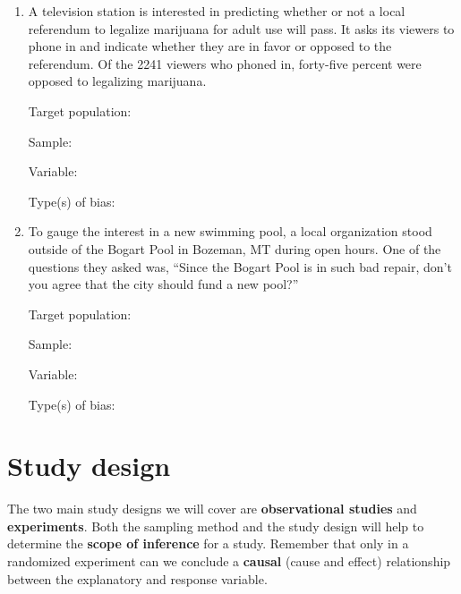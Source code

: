 \documentclass[
]{report}
\begin{document}
\begin{enumerate}
\def\labelenumi{\arabic{enumi}.}
\setcounter{enumi}{2}
\item
  A television station is interested in predicting whether or not a local referendum to legalize marijuana for adult use will pass. It asks its viewers to phone in and indicate whether they are in favor or opposed to the referendum. Of the 2241 viewers who phoned in, forty-five percent were opposed to legalizing marijuana.
  \vspace{0.1in}

  Target population:
  \vspace{0.3in}

  Sample:
  \vspace{0.3in}

  Variable:
  \vspace{0.3in}

  Type(s) of bias:
  \vspace{0.3in}
\item
  To gauge the interest in a new swimming pool, a local organization stood outside of the Bogart Pool in Bozeman, MT during open hours. One of the questions they asked was, ``Since the Bogart Pool is in such bad repair, don't you agree that the city should fund a new pool?''
  \vspace{0.1in}

  Target population:
  \vspace{0.3in}

  Sample:
  \vspace{0.3in}

  Variable:
  \vspace{0.3in}

  Type(s) of bias:
  \vspace{0.3in}
\end{enumerate}

\newpage

\hypertarget{study-design}{%
\section{Study design}\label{study-design}}

The two main study designs we will cover are \textbf{observational studies} and \textbf{experiments}. Both the sampling method and the study design will help to determine the \textbf{scope of inference} for a study. Remember that only in a randomized experiment can we conclude a \textbf{causal} (cause and effect) relationship between the explanatory and response variable.
\end{document}
